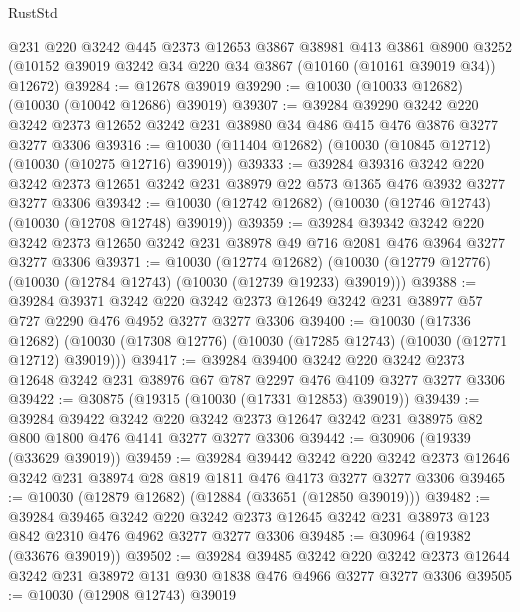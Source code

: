 \begin{lexlean}{RustStd}
\begin{coremodule}
    @231
    @220
    @3242
    @445
    @2373
    @12653
    @3867
    @38981
    @413
    @3861
    @8900
    @3252
    (@10152 @39019 @3242 @34 @220 @34 @3867 (@10160 (@10161 @39019 @34)) @12672)
@39284 := @12678 @39019
@39290 := @10030 (@10033 @12682) (@10030 (@10042 @12686) @39019)
@39307 := @39284
    @39290
    @3242
    @220
    @3242
    @2373
    @12652
    @3242
    @231
    @38980
    @34
    @486
    @415
    @476
    @3876
    @3277
    @3277
    @3306
@39316 := @10030 (@11404 @12682) (@10030 (@10845 @12712) (@10030 (@10275 @12716) @39019))
@39333 := @39284
    @39316
    @3242
    @220
    @3242
    @2373
    @12651
    @3242
    @231
    @38979
    @22
    @573
    @1365
    @476
    @3932
    @3277
    @3277
    @3306
@39342 := @10030 (@12742 @12682) (@10030 (@12746 @12743) (@10030 (@12708 @12748) @39019))
@39359 := @39284
    @39342
    @3242
    @220
    @3242
    @2373
    @12650
    @3242
    @231
    @38978
    @49
    @716
    @2081
    @476
    @3964
    @3277
    @3277
    @3306
@39371 := @10030
    (@12774 @12682)
    (@10030 (@12779 @12776) (@10030 (@12784 @12743) (@10030 (@12739 @19233) @39019)))
@39388 := @39284
    @39371
    @3242
    @220
    @3242
    @2373
    @12649
    @3242
    @231
    @38977
    @57
    @727
    @2290
    @476
    @4952
    @3277
    @3277
    @3306
@39400 := @10030
    (@17336 @12682)
    (@10030 (@17308 @12776) (@10030 (@17285 @12743) (@10030 (@12771 @12712) @39019)))
@39417 := @39284
    @39400
    @3242
    @220
    @3242
    @2373
    @12648
    @3242
    @231
    @38976
    @67
    @787
    @2297
    @476
    @4109
    @3277
    @3277
    @3306
@39422 := @30875 (@19315 (@10030 (@17331 @12853) @39019))
@39439 := @39284
    @39422
    @3242
    @220
    @3242
    @2373
    @12647
    @3242
    @231
    @38975
    @82
    @800
    @1800
    @476
    @4141
    @3277
    @3277
    @3306
@39442 := @30906 (@19339 (@33629 @39019))
@39459 := @39284
    @39442
    @3242
    @220
    @3242
    @2373
    @12646
    @3242
    @231
    @38974
    @28
    @819
    @1811
    @476
    @4173
    @3277
    @3277
    @3306
@39465 := @10030 (@12879 @12682) (@12884 (@33651 (@12850 @39019)))
@39482 := @39284
    @39465
    @3242
    @220
    @3242
    @2373
    @12645
    @3242
    @231
    @38973
    @123
    @842
    @2310
    @476
    @4962
    @3277
    @3277
    @3306
@39485 := @30964 (@19382 (@33676 @39019))
@39502 := @39284
    @39485
    @3242
    @220
    @3242
    @2373
    @12644
    @3242
    @231
    @38972
    @131
    @930
    @1838
    @476
    @4966
    @3277
    @3277
    @3306
@39505 := @10030 (@12908 @12743) @39019

\end{coremodule}
\end{lexlean}
